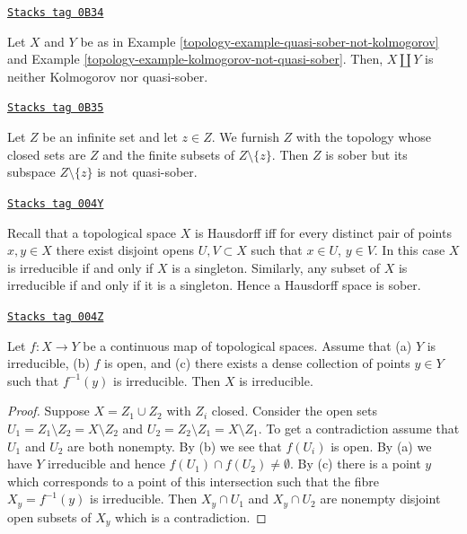 \begin{example}
\label{topology-example-not-kolmogorov-not-quasi-sober}
\href{https://stacks.math.columbia.edu/tag/0B34}{\texttt{Stacks tag 0B34}}

Let $X$ and $Y$ be as in Example \ref{topology-example-quasi-sober-not-kolmogorov} and
Example \ref{topology-example-kolmogorov-not-quasi-sober}. Then, $X\amalg Y$ is neither
Kolmogorov nor quasi-sober.
\end{example}

\begin{example}
\label{topology-example-sober-subspace}
\href{https://stacks.math.columbia.edu/tag/0B35}{\texttt{Stacks tag 0B35}}

Let $Z$ be an infinite set and let $z\in Z$. We furnish $Z$ with the topology
whose closed sets are $Z$ and the finite subsets of $Z\setminus\{z\}$. Then $Z$
is sober but its subspace $Z\setminus\{z\}$ is not quasi-sober.
\end{example}

\begin{example}[Hausdorff]
\label{topology-example-Hausdorff}
\href{https://stacks.math.columbia.edu/tag/004Y}{\texttt{Stacks tag 004Y}}

Recall that a topological space $X$ is Hausdorff iff for every
distinct pair of points $x, y \in X$ there exist disjoint
opens $U, V \subset X$ such that $x \in U$, $y \in V$.
In this case $X$ is irreducible if and only if $X$ is
a singleton. Similarly, any subset of $X$ is irreducible
if and only if it is a singleton. Hence a Hausdorff space is
sober.
\end{example}

\begin{lemma}
\label{topology-lemma-irreducible-on-top}
\href{https://stacks.math.columbia.edu/tag/004Z}{\texttt{Stacks tag 004Z}}

Let $f : X \to Y$ be a continuous map of topological spaces.
Assume that
(a) $Y$ is irreducible,
(b) $f$ is open, and
(c) there exists a dense collection of points $y \in Y$ such
that $f^{-1}(y)$ is irreducible.
Then $X$ is irreducible.
\end{lemma}

\begin{proof}
Suppose $X = Z_1 \cup Z_2$ with $Z_i$ closed.
Consider the open sets $U_1 = Z_1 \setminus Z_2 = X \setminus Z_2$ and
$U_2 = Z_2 \setminus Z_1 = X \setminus Z_1$. To get a contradiction
assume that $U_1$ and $U_2$ are both nonempty. By (b) we see that $f(U_i)$
is open. By (a) we have $Y$ irreducible and hence
$f(U_1) \cap f(U_2) \not = \emptyset$. By (c) there is a point $y$ which
corresponds to a point of this intersection such that the fibre
$X_y = f^{-1}(y)$ is irreducible. Then $X_y \cap U_1$ and
$X_y \cap U_2$ are nonempty disjoint open subsets of $X_y$ which is
a contradiction.
\end{proof}

